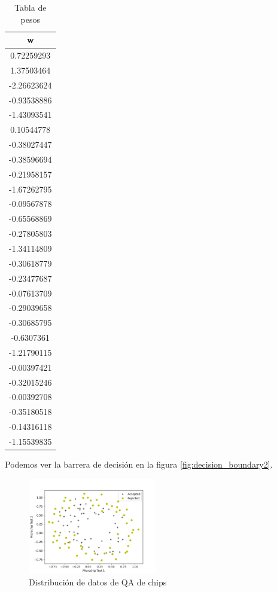 \documentclass[6pt]{AiTex}
\begin{document}
\begin{table}[H]
    \centering
    \begin{tabular}{|c|}
        \hline
        \textbf{w}  \\
        \hline
        0.72259293  \\ \hline
        1.37503464  \\ \hline
        -2.26623624 \\ \hline
        -0.93538886 \\ \hline
        -1.43093541 \\ \hline
        0.10544778  \\ \hline
        -0.38027447 \\ \hline
        -0.38596694 \\ \hline
        -0.21958157 \\ \hline
        -1.67262795 \\ \hline
        -0.09567878 \\ \hline
        -0.65568869 \\ \hline
        -0.27805803 \\ \hline
        -1.34114809 \\ \hline
        -0.30618779 \\ \hline
        -0.23477687 \\ \hline
        -0.07613709 \\ \hline
        -0.29039658 \\ \hline
        -0.30685795 \\ \hline
        -0.6307361  \\ \hline
        -1.21790115 \\ \hline
        -0.00397421 \\ \hline
        -0.32015246 \\ \hline
        -0.00392708 \\ \hline
        -0.35180518 \\ \hline
        -0.14316118 \\ \hline
        -1.15539835 \\ \hline
    \end{tabular}
    \caption{Tabla de pesos}
    \label{tab:w}
\end{table}

Podemos ver la barrera de decisión en la figura \ref{fig:decision_boundary2}.

\begin{figure}[H]
    \centering
    \includegraphics[width=0.5\textwidth]{./imagenes/muestreo2.png}
    \caption{Distribución de datos de QA de chips}
    \label{fig:dataset2}
\end{figure}
\end{document}
